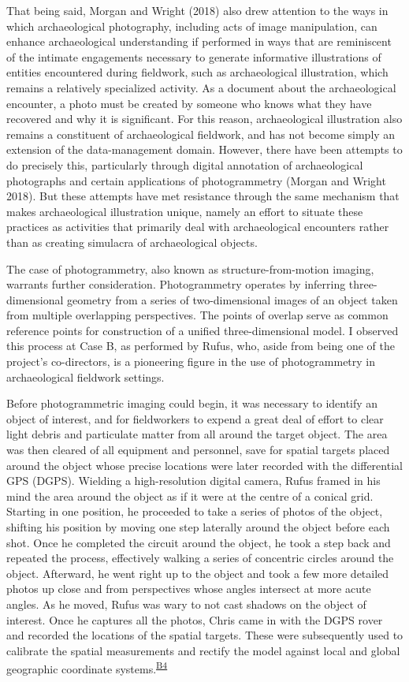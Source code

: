 \documentclass[
]{article}
\begin{document}
That being said, Morgan and Wright (2018) also drew attention to the
ways in which archaeological photography, including acts of image
manipulation, can enhance archaeological understanding if performed in
ways that are reminiscent of the intimate engagements necessary to
generate informative illustrations of entities encountered during
fieldwork, such as archaeological illustration, which remains a
relatively specialized activity. As a document about the archaeological
encounter, a photo must be created by someone who knows what they have
recovered and why it is significant. For this reason, archaeological
illustration also remains a constituent of archaeological fieldwork, and
has not become simply an extension of the data-management domain.
However, there have been attempts to do precisely this, particularly
through digital annotation of archaeological photographs and certain
applications of photogrammetry (Morgan and Wright 2018). But these
attempts have met resistance through the same mechanism that makes
archaeological illustration unique, namely an effort to situate these
practices as activities that primarily deal with archaeological
encounters rather than as creating simulacra of archaeological objects.

The case of photogrammetry, also known as structure-from-motion imaging,
warrants further consideration. Photogrammetry operates by inferring
three-dimensional geometry from a series of two-dimensional images of an
object taken from multiple overlapping perspectives. The points of
overlap serve as common reference points for construction of a unified
three-dimensional model. I observed this process at Case B, as performed
by Rufus, who, aside from being one of the project's co-directors, is a
pioneering figure in the use of photogrammetry in archaeological
fieldwork settings.

Before photogrammetric imaging could begin, it was necessary to identify
an object of interest, and for fieldworkers to expend a great deal of
effort to clear light debris and particulate matter from all around the
target object. The area was then cleared of all equipment and personnel,
save for spatial targets placed around the object whose precise
locations were later recorded with the differential GPS (DGPS). Wielding
a high-resolution digital camera, Rufus framed in his mind the area
around the object as if it were at the centre of a conical grid.
Starting in one position, he proceeded to take a series of photos of the
object, shifting his position by moving one step laterally around the
object before each shot. Once he completed the circuit around the
object, he took a step back and repeated the process, effectively
walking a series of concentric circles around the object. Afterward, he
went right up to the object and took a few more detailed photos up close
and from perspectives whose angles intersect at more acute angles. As he
moved, Rufus was wary to not cast shadows on the object of interest.
Once he captures all the photos, Chris came in with the DGPS rover and
recorded the locations of the spatial targets. These were subsequently
used to calibrate the spatial measurements and rectify the model against
local and global geographic coordinate
systems.\textsuperscript{\hyperref[sec-B4]{B4}}
\end{document}
